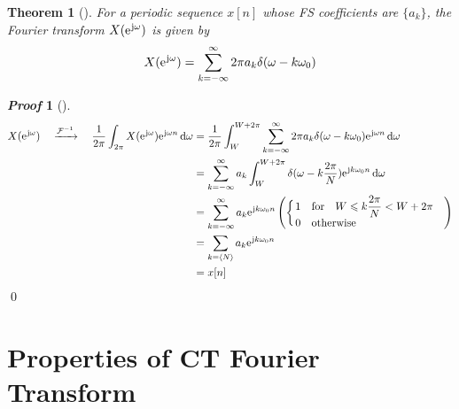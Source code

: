 \documentclass[10pt,UTF8]{article}
\makeatletter
\newenvironment{definition box}
{\begin{tcolorbox}[colback=blue!5!white,colframe=blue!75!black,parbox=false,before upper=\par,before lower=\par]}
{\end{tcolorbox}}
\newenvironment{theorem box}
{\begin{tcolorbox}[colback=yellow!5!white,colframe=yellow!75!black,parbox=false,before upper=\par,before lower=\par]}
{\end{tcolorbox}}
\theoremstyle{definition}
\newtheorem{definition inner}{Definition}[section]
\theoremstyle{plain}
\newtheorem{theorem inner}{Theorem}[section]
\newenvironment{theorem}[1][]
{\begin{theorem box}\begin{theorem inner}[#1]\hfill\par}
{\end{theorem inner}\end{theorem box}}
\theoremstyle{definition}
\newtheorem*{proof inner}{\textit{Proof}}
\renewenvironment{proof}[1][]
{\begin{proof inner}[#1]\hfill\par}
{\qed\end{proof inner}}
\theoremstyle{remark}
\newcommand{\mycases}[2][0.8]{
    \left\{\vphantom{\scalebox{#1}{
        $\begin{matrix}#2\end{matrix}$
    }}\right.\!\!\!\!
    \begin{array}{l@{\quad}l}#2\end{array}
}
\newcommand{\ju}{\mathrm{j}}  %
\newcommand{\e}{\mathrm{e}{\mkern 1 mu}}
\makeatother
\begin{document}
\begin{theorem}
    For a periodic sequence $x[n]$ whose FS coefficients are $\{a_k\}$,
    the Fourier transform $X(\e^{\ju\omega})$ is given by
    \begin{equation*}
        X(\e^{\ju\omega}) = \sum_{k=-\infty}^{\infty} 
        2\pi a_k \delta(\omega-k\omega_0)
    \end{equation*}
\end{theorem}
\begin{proof}
\begin{align*}
    X(\e^{\ju\omega})
    \quad\xrightarrow{\mathcal{F}^{-1}}\quad
    \frac{1}{2\pi}\int_{2\pi}
    X(\e^{\ju\omega})\e^{\ju\omega n}\dd{\omega}
    &=  \frac{1}{2\pi}\int_{W}^{W+2\pi}
    \sum_{k=-\infty}^{\infty}
    2\pi a_k \delta(\omega-k\omega_0)
    \e^{\ju\omega n}\dd{\omega} \\
    &= \sum_{k=-\infty}^{\infty}
    a_k \int_{W}^{W+2\pi}
    \delta(\omega-k\frac{2\pi}{N})
    \e^{\ju k\omega_0 n}\dd{\omega} \\
    &= \sum_{k=-\infty}^{\infty}
    a_k \e^{\ju k\omega_0 n}
    \left(\mycases{
        1 \qfor W \leqslant k \dfrac{2\pi}{N} < W+2\pi \\
        0 \qotherwise
    }\right) \\
    &= \sum_{k=\langle N\rangle}
    a_k\e^{\ju k\omega_0 n} \\
    &= x[n]
\end{align*}
\end{proof}



\section{Properties of CT Fourier Transform}
\end{document}
